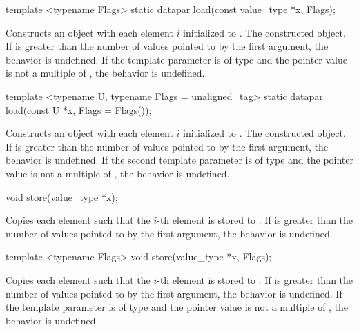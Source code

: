 \begin{wgText}
  \begin{itemdecl}
template <typename Flags> static datapar load(const value_type *x, Flags);
  \end{itemdecl}
  \begin{itemdescr}
    \pnum\effects Constructs an object with each element $i$ initialized to .
    \pnum\returns The constructed object.
    \pnum\remarks If \datapar{} is greater than the number of values pointed to by the first argument, the behavior is undefined.
    \pnum         If the template parameter is of type  and the pointer value is not a multiple of , the behavior is undefined.
  \end{itemdescr}

  \begin{itemdecl}
template <typename U, typename Flags = unaligned_tag> static datapar load(const U *x, Flags = Flags());
  \end{itemdecl}
  \begin{itemdescr}
    \pnum\effects Constructs an object with each element $i$ initialized to .
    \pnum\returns The constructed object.
    \pnum\remarks If \datapar{} is greater than the number of values pointed to by the first argument, the behavior is undefined.
    \pnum         If the second template parameter is of type  and the pointer value is not a multiple of , the behavior is undefined.
  \end{itemdescr}

  \begin{itemdecl}
void store(value_type *x);
  \end{itemdecl}
  \begin{itemdescr}
    \pnum\effects Copies each element such that the $i$-th element is stored to .
    \pnum\remarks If \datapar{} is greater than the number of values pointed to by the first argument, the behavior is undefined.
  \end{itemdescr}

  \begin{itemdecl}
template <typename Flags> void store(value_type *x, Flags);
  \end{itemdecl}
  \begin{itemdescr}
    \pnum\effects Copies each element such that the $i$-th element is stored to .
    \pnum\remarks If \datapar{} is greater than the number of values pointed to by the first argument, the behavior is undefined.
    \pnum         If the template parameter is of type  and the pointer value is not a multiple of , the behavior is undefined.
  \end{itemdescr}


\end{wgText}
